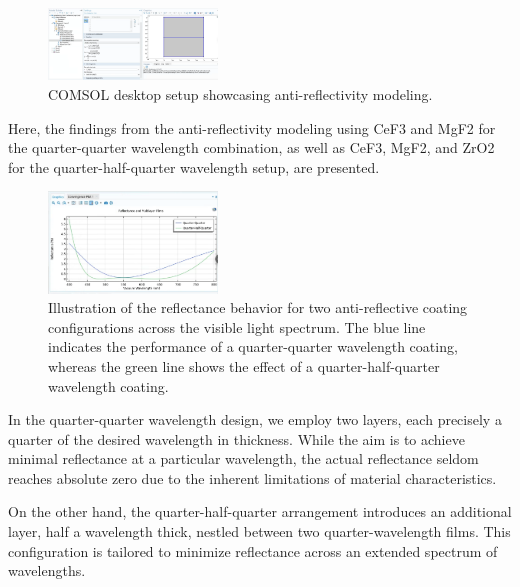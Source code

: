 \begin{figure}[ht!]
  \centering
  \includegraphics[width=0.4\textwidth]{Chapters/Figures/Chapter 4 Figures/COMSOL Desktop Showcasing Antireflectivity Setup.png}
  \caption{COMSOL desktop setup showcasing anti-reflectivity modeling.}
  \label{fig:COMSOL desktop showcasing antireflectivity}
\end{figure}

Here, the findings from the anti-reflectivity modeling using CeF3 and MgF2 for the quarter-quarter wavelength combination, as well as CeF3, MgF2, and ZrO2 for the quarter-half-quarter wavelength setup, are presented.

\begin{figure}[ht!]
  \centering
  \includegraphics[width=0.4\textwidth]{Chapters/Figures/Chapter 4 Figures/Quarter-Half-Quarter.png}
  \caption{Illustration of the reflectance behavior for two anti-reflective coating configurations across the visible light spectrum. The blue line indicates the performance of a quarter-quarter wavelength coating, whereas the green line shows the effect of a quarter-half-quarter wavelength coating.}
  \label{fig:both quarter-quarter and quarter-half-quarter}
\end{figure}

In the quarter-quarter wavelength design, we employ two layers, each precisely a quarter of the desired wavelength in thickness. While the aim is to achieve minimal reflectance at a particular wavelength, the actual reflectance seldom reaches absolute zero due to the inherent limitations of material characteristics.

On the other hand, the quarter-half-quarter arrangement introduces an additional layer, half a wavelength thick, nestled between two quarter-wavelength films. This configuration is tailored to minimize reflectance across an extended spectrum of wavelengths.

